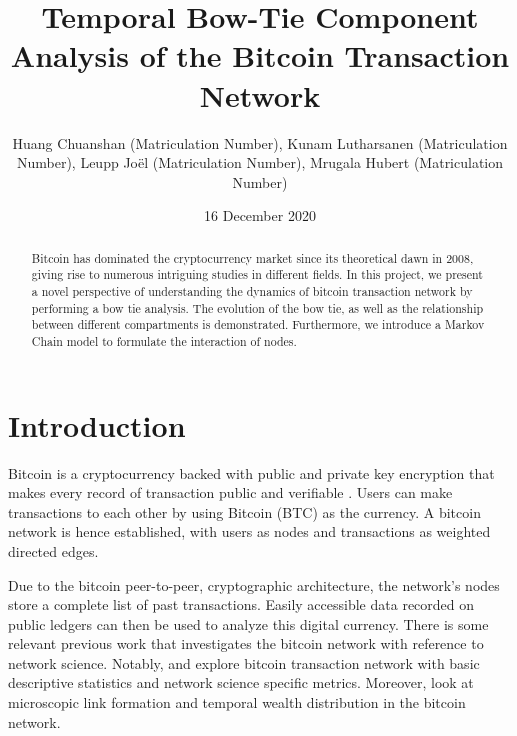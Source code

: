 \documentclass{Resources/netsci-project}
\begin{document}

\title{Temporal Bow-Tie Component Analysis of the Bitcoin Transaction Network}
\author{Huang Chuanshan (Matriculation Number), Kunam Lutharsanen (Matriculation Number), Leupp Joël (Matriculation Number), Mrugala Hubert (Matriculation Number)}
\date{16 December 2020}

\maketitle

\begin{abstract}
Bitcoin has dominated the cryptocurrency market since its theoretical dawn in 2008, giving rise to numerous intriguing studies in different fields. In this project, we present a novel perspective of understanding the dynamics of bitcoin transaction network by performing a bow tie analysis. The evolution of the bow tie, as well as the relationship between different compartments is demonstrated. Furthermore, we introduce a Markov Chain model to formulate the interaction of nodes. 

\end{abstract}

\section{Introduction}

Bitcoin is a cryptocurrency backed with public and private key encryption that makes every record of transaction public and verifiable \autocite{Nakamoto2008}. Users can make transactions to each other by using Bitcoin (BTC) as the currency. A bitcoin network is hence established, with users as nodes and transactions as weighted directed edges.  

Due to the bitcoin peer-to-peer, cryptographic architecture, the network's nodes store a complete list of past transactions. Easily accessible data recorded on public ledgers can then be used to analyze this digital currency. There is some relevant previous work that investigates the bitcoin network with reference to network science. Notably, \textcite{Lischke2016} and \textcite{Baumann2014} explore bitcoin transaction network with basic descriptive statistics and network science specific metrics. Moreover, \textcite{Kondor2014} look at microscopic link formation and temporal wealth distribution in the bitcoin network.
\end{document}
